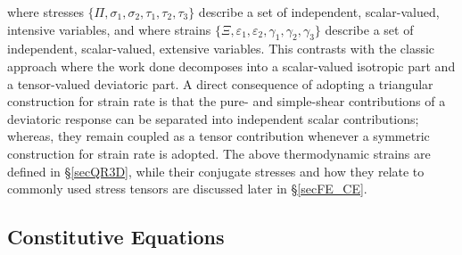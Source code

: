 where stresses $\{ \Pi , \sigma_1 , \sigma_2 , \tau_1 , \tau_2 , \tau_3  \}$ describe a set of independent, scalar-valued, intensive variables, and where strains $\{ \Xi , \varepsilon_1 , \varepsilon_2 , \gamma_1 , \gamma_2 , \gamma_3 \}$ describe a set of independent, scalar-valued, extensive variables.  This contrasts with the classic approach where the work done decomposes into a scalar-valued isotropic part and a tensor-valued deviatoric part.  A direct consequence of adopting a triangular construction for strain rate is that the pure- and simple-shear contributions of a deviatoric response can be separated into independent scalar contributions; whereas, they remain coupled as a tensor contribution whenever a symmetric construction for strain rate is adopted.  The above thermo\-dynamic strains are defined in \S\ref{secQR3D}, while their conjugate stresses and how they relate to commonly used stress tensors are discussed later in \S\ref{secFE_CE}. 

\subsection{Constitutive Equations}

